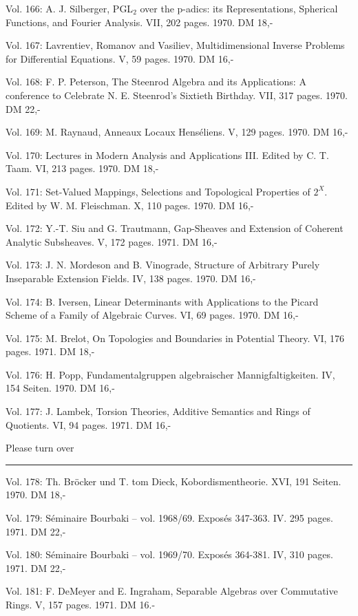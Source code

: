Vol. 166: A. J. Silberger, PGL$_2$ over the p-adics: its Representations, Spherical Functions, and Fourier Analysis. VII, 202 pages. 1970. DM 18,-

Vol. 167: Lavrentiev, Romanov and Vasiliev, Multidimensional Inverse Problems for Differential Equations. V, 59 pages. 1970. DM 16,-

Vol. 168: F. P. Peterson, The Steenrod Algebra and its Applications: A conference to Celebrate N. E. Steenrod's Sixtieth Birthday. VII, 317 pages. 1970. DM 22,-

Vol. 169: M. Raynaud, Anneaux Locaux Henséliens. V, 129 pages. 1970. DM 16,-

Vol. 170: Lectures in Modern Analysis and Applications III. Edited by C. T. Taam. VI, 213 pages. 1970. DM 18,-

Vol. 171: Set-Valued Mappings, Selections and Topological Properties of $2^X$. Edited by W. M. Fleischman. X, 110 pages. 1970. DM 16,-

Vol. 172: Y.-T. Siu and G. Trautmann, Gap-Sheaves and Extension of Coherent Analytic Subsheaves. V, 172 pages. 1971. DM 16,-

Vol. 173: J. N. Mordeson and B. Vinograde, Structure of Arbitrary Purely Inseparable Extension Fields. IV, 138 pages. 1970. DM 16,-

Vol. 174: B. Iversen, Linear Determinants with Applications to the Picard Scheme of a Family of Algebraic Curves. VI, 69 pages. 1970. DM 16,-

Vol. 175: M. Brelot, On Topologies and Boundaries in Potential Theory. VI, 176 pages. 1971. DM 18,-

Vol. 176: H. Popp, Fundamentalgruppen algebraischer Mannigfaltigkeiten. IV, 154 Seiten. 1970. DM 16,-

Vol. 177: J. Lambek, Torsion Theories, Additive Semantics and Rings of Quotients. VI, 94 pages. 1971. DM 16,-

Please turn over



\noindent\rule{\linewidth}{0.4pt}

Vol. 178: Th. Bröcker und T. tom Dieck, Kobordismentheorie. XVI, 191 Seiten. 1970. DM 18,-

Vol. 179: Séminaire Bourbaki -- vol. 1968/69. Exposés 347-363. IV. 295 pages. 1971. DM 22,-

Vol. 180: Séminaire Bourbaki -- vol. 1969/70. Exposés 364-381. IV, 310 pages. 1971. DM 22,-

Vol. 181: F. DeMeyer and E. Ingraham, Separable Algebras over Commutative Rings. V, 157 pages. 1971. DM 16.-

